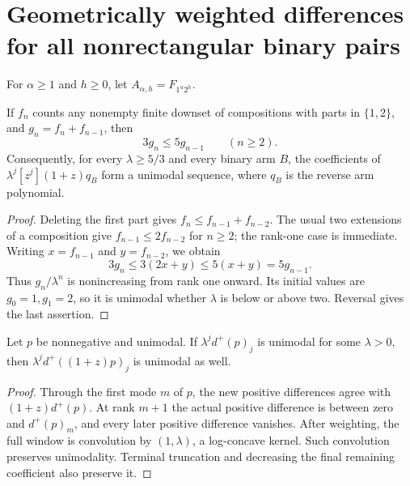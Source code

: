 \section{Geometrically weighted differences for all nonrectangular binary pairs}
For $\alpha\ge1$ and $h\ge0$, let $A_{\alpha,h}=F_{1^\alpha2^h}$.

\begin{lemma}
If $f_n$ counts any nonempty finite downset of compositions with
parts in $\{1,2\}$, and $g_n=f_n+f_{n-1}$, then
\[
                 3g_n\le5g_{n-1}\qquad(n\ge2).
\]
Consequently, for every $\lambda\ge5/3$ and every binary arm $B$,
the coefficients of $\lambda^j[z^j](1+z)q_B$ form a unimodal
sequence, where $q_B$ is the reverse arm polynomial.
\end{lemma}
\begin{proof}
Deleting the first part gives $f_n\le f_{n-1}+f_{n-2}$.
The usual two extensions of a composition give
$f_{n-1}\le2f_{n-2}$ for $n\ge2$; the rank-one case is immediate.
Writing $x=f_{n-1}$ and $y=f_{n-2}$, we obtain
\[
 3g_n\le3(2x+y)\le5(x+y)=5g_{n-1}.
\]
Thus $g_n/\lambda^n$ is nonincreasing from rank one onward.
Its initial values are $g_0=1,g_1=2$, so it is unimodal whether
$\lambda$ is below or above two. Reversal gives the last assertion.
\end{proof}

\begin{lemma}
Let $p$ be nonnegative and unimodal. If
$\lambda^j d^+(p)_j$ is unimodal for some $\lambda>0$, then
$\lambda^j d^+((1+z)p)_j$ is unimodal as well.
\end{lemma}
\begin{proof}
Through the first mode $m$ of $p$, the new positive differences
agree with $(1+z)d^+(p)$. At rank $m+1$ the actual positive
difference is between zero and $d^+(p)_m$, and every later
positive difference vanishes. After weighting, the full window
is convolution by $(1,\lambda)$, a log-concave kernel. Such
convolution preserves unimodality. Terminal truncation and
decreasing the final remaining coefficient also preserve it.
\end{proof}

